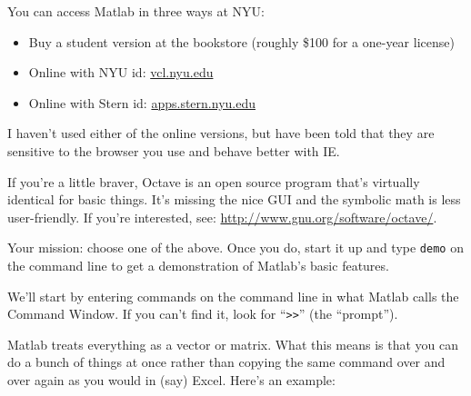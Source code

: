 \documentclass[11pt]{exam}
\begin{document}
\begin{questions}
You can access Matlab in three ways at NYU:
\begin{itemize}
\item Buy a student version at the bookstore (roughly \$100 for a one-year license)
\item Online with NYU id:  \url{vcl.nyu.edu}
\item Online with Stern id: \url{apps.stern.nyu.edu}
\end{itemize}
I haven't used either of the online versions,
but have been told that they are sensitive to the browser you use and behave better with IE.

If you're a little braver, Octave is an open source program that's virtually identical
for basic things.  It's missing the nice GUI and the symbolic math is less user-friendly.
If you're interested, see:  \url{http://www.gnu.org/software/octave/}.

Your mission:  choose one of the above.
Once you do, start it up and type
{\tt demo} on the command line to get a demonstration of Matlab's basic
features.

 We'll start by entering commands on the command line
in what Matlab calls the Command Window.
If you can't find it, look for ``{\tt >>}'' (the ``prompt'').

Matlab treats everything as a vector or matrix.
What this means is that you can do a bunch of things at once rather than copying the same command
over and over again as you would in (say) Excel.  Here's an example:
\end{questions}
\end{document}
